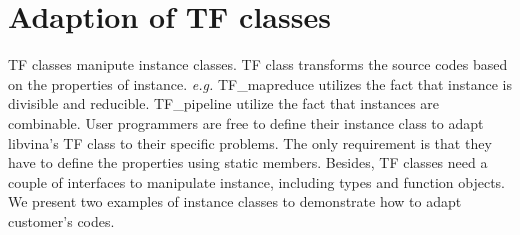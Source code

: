 \documentclass[10pt, conference, compsocconf]{IEEEtran}
\begin{document}
\section{Adaption of TF classes}
TF classes manipute instance classes. TF class transforms the source codes based on the properties
of instance. \textit{e.g.} TF\_mapreduce utilizes the fact that
instance is divisible and reducible. TF\_pipeline utilize the fact
that instances are combinable.  
User programmers are free to define their instance class to adapt libvina's TF class to their specific
problems. The only requirement is that they have to define the
properties using static members. Besides, TF classes need a couple of
interfaces to manipulate instance, including types and function
objects. We present two examples
of instance classes to demonstrate how to adapt customer's codes.
\end{document}
